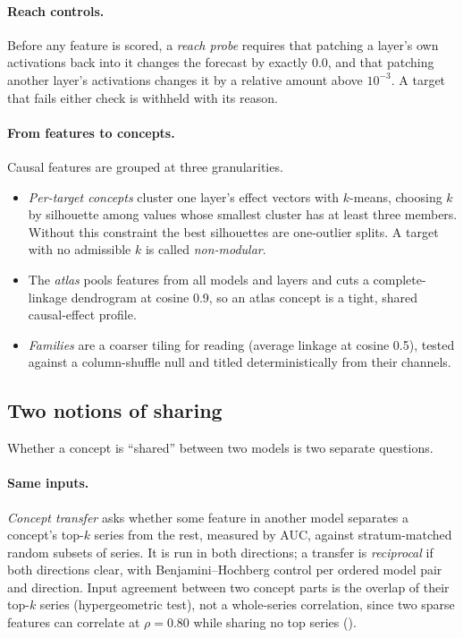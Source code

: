 \paragraph{Reach controls.} Before any feature is scored, a \emph{reach probe} requires that patching a layer's own
activations back into it changes the forecast by exactly $0.0$, and that patching another layer's activations changes it
by a relative amount above $10^{-3}$. A target that fails either check is withheld with its reason.


\paragraph{From features to concepts.} Causal features are grouped at three granularities.
\begin{itemize}
  \item \emph{Per-target concepts} cluster one layer's effect vectors with $k$-means, choosing $k$ by silhouette
    \citep{rousseeuw1987silhouette} among values whose smallest cluster has at least three members. Without this
    constraint the best silhouettes are one-outlier splits. A target with no admissible $k$ is called
    \emph{non-modular}.
  \item The \emph{atlas} pools features from all models and layers and cuts a complete-linkage dendrogram at cosine
    0.9, so an atlas concept is a tight, shared causal-effect profile.
  \item \emph{Families} are a coarser tiling for reading (average linkage at cosine 0.5), tested against a
    column-shuffle null and titled deterministically from their channels.
\end{itemize}

\subsection{Two notions of sharing}
\label{sec:sharing}

Whether a concept is ``shared'' between two models is two separate questions.

\paragraph{Same inputs.} \emph{Concept transfer} asks whether some feature in another model separates a concept's
top-$k$ series from the rest, measured by AUC, against stratum-matched random subsets of series. It is run in both
directions; a transfer is \emph{reciprocal} if both directions clear, with Benjamini--Hochberg control
\citep{benjamini1995fdr} per ordered model pair and direction. Input agreement between two concept parts is the overlap of
their top-$k$ series (hypergeometric test), not a whole-series correlation, since two sparse features can correlate at
$\rho=0.80$ while sharing no top series ().

